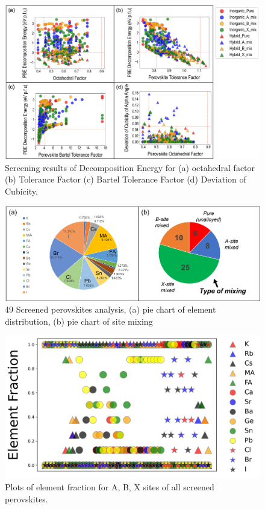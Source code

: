 \documentclass[twoside, twocolumn, 9pt, draft]{article}
\begin{document}
\begin{figure}
\centering
\includegraphics[width=.9\linewidth]{screening_factor.png}
\caption{\label{fig:cuts} Screening results of Decomposition Energy for (a) octahedral factor (b) Tolerance Factor (c) Bartel Tolerance Factor (d) Deviation of Cubicity.}
\end{figure}

\begin{figure}
\centering
\includegraphics[width=.9\linewidth]{screening_pie.png}
\caption{\label{fig:leftover} 49 Screened perovskites analysis, (a) pie chart of element distribution, (b) pie chart of site mixing}
\end{figure}

\begin{figure}
\centering
\includegraphics[width=.9\linewidth]{Element_Frac.jpg}
\caption{\label{fig:leftover_comp} Plots of element fraction for A, B, X sites of all screened perovskites.}
\end{figure}
\end{document}

